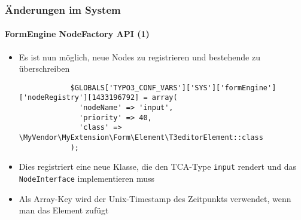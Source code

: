 
\begin{frame}[fragile]
	\frametitle{Änderungen im System}
	\framesubtitle{FormEngine NodeFactory API (1)}

	\lstset{basicstyle=\tiny\ttfamily}

	\begin{itemize}

		\item Es ist nun möglich, neue Nodes zu registrieren und bestehende zu
			überschreiben

		\begin{lstlisting}
			$GLOBALS['TYPO3_CONF_VARS']['SYS']['formEngine']['nodeRegistry'][1433196792] = array(
			  'nodeName' => 'input',
			  'priority' => 40,
			  'class' => \MyVendor\MyExtension\Form\Element\T3editorElement::class
			);
		\end{lstlisting}

		\item Dies registriert eine neue Klasse, die den TCA-Type \texttt{input}
			rendert und das \texttt{NodeInterface} implementieren muss

		\item Als Array-Key wird der Unix-Timestamp des Zeitpunkts verwendet,
			wenn man das Element zufügt

	\end{itemize}

\end{frame}


